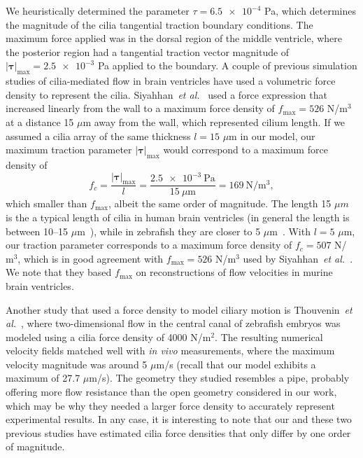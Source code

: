 \documentclass[fleqn]{wlscirep}
\newcommand{\btau}{\bm{\tau}}
\begin{document}
We heuristically determined the parameter $\tau = \num{6.5e-4}$ Pa, which determines
the magnitude of the cilia tangential traction boundary conditions. The maximum force applied
was in the dorsal region of the middle ventricle, where the posterior region had a tangential
traction vector magnitude of $\vert\btau\vert_{\mathrm{max}} = \num{2.5e-3}$ Pa applied to the
boundary. A couple of previous simulation studies of cilia-mediated flow in brain ventricles have
used a volumetric force density to represent the cilia. Siyahhan~\emph{et al.}~\cite{Siyahhan2014FlowVentricles}
used a force expression that increased linearly from the wall to a maximum force density of
$f_{\mathrm{max}} = 526$ N/$\mathrm{m^3}$ at a distance 15 $\mu$m away from the wall,
which represented cilium length. If we assumed a cilia array of the same thickness
$l = 15$ $\mu$m in our model, our maximum traction parameter $\vert\btau\vert_{\mathrm{max}}$
would correspond to a maximum force density of 
\begin{equation*}
    f_c = \frac{\vert\btau\vert_{\mathrm{max}}}{l} = \frac{\num{2.5e-3} \ \mathrm{Pa}}{15 \ \mu\mathrm{m}} = 169 \ \mathrm{N/m^3},
\end{equation*}
which smaller than $f_{\mathrm{max}}$, albeit the same order of magnitude.
The length 15 $\mu m$ is the a typical length of cilia in human brain ventricles
(in general the length is between 10--15 $\mu$m~\cite{Afzelius2004Cilia-relatedDiseases}),
while in zebrafish they are closer to 5 $\mu$m~\cite{Salman2022ComputationalEmbryo}.
With $l=5$ $\mu$m, our traction parameter corresponds to a maximum force density of
$f_c=507$ N/$\mathrm{m^3}$, which is in good agreement with $f_{\mathrm{max}} = 526$ N/$\mathrm{m^3}$
used by Siyahhan~\emph{et al.}~\cite{Siyahhan2014FlowVentricles}.
We note that they based $f_{\mathrm{max}}$ on reconstructions of flow velocities in murine brain ventricles.

Another study that used a force density to model ciliary motion is
Thouvenin~\emph{et al.}~\cite{Thouvenin2020OriginCanal}, where two-dimensional flow
in the central canal of zebrafish embryos was modeled using a cilia force density of
4000 N/$\mathrm{m^2}$. The resulting numerical velocity fields matched well with
\emph{in vivo} measurements, where the maximum velocity magnitude was around 5 $\mu$m/s
(recall that our model exhibits a maximum of 27.7 $\mu$m/s).
The geometry they studied resembles a pipe, probably offering more flow resistance
than the open geometry considered in our work, which may be why they needed a larger
force density to accurately represent experimental results. In any case, it is
interesting to note that our and these two previous studies have estimated
cilia force densities that only differ by one order of magnitude.
\end{document}
